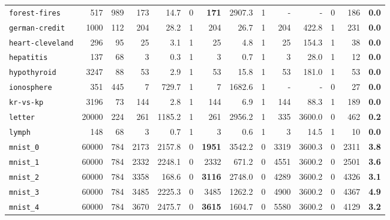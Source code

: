 \begin{tabular}{lccrrrrrrrrrrr}
\texttt{forest-fires} & \multicolumn{1}{r}{517} & \multicolumn{1}{r}{989}  & 173 & 14.7 & 0 & \textbf{171} & 2907.3 & 1 & - & - & 0 & 186 & \textbf{0.0}\\
\texttt{german-credit} & \multicolumn{1}{r}{1000} & \multicolumn{1}{r}{112}  & 204 & 28.2 & 1 & 204 & 26.7 & 1 & 204 & 422.8 & 1 & 231 & \textbf{0.0}\\
\texttt{heart-cleveland} & \multicolumn{1}{r}{296} & \multicolumn{1}{r}{95}  & 25 & 3.1 & 1 & 25 & 4.8 & 1 & 25 & 154.3 & 1 & 38 & \textbf{0.0}\\
\texttt{hepatitis} & \multicolumn{1}{r}{137} & \multicolumn{1}{r}{68}  & 3 & 0.3 & 1 & 3 & 0.7 & 1 & 3 & 28.0 & 1 & 12 & \textbf{0.0}\\
\texttt{hypothyroid} & \multicolumn{1}{r}{3247} & \multicolumn{1}{r}{88}  & 53 & 2.9 & 1 & 53 & 15.8 & 1 & 53 & 181.0 & 1 & 53 & \textbf{0.0}\\
\texttt{ionosphere} & \multicolumn{1}{r}{351} & \multicolumn{1}{r}{445}  & 7 & 729.7 & 1 & 7 & 1682.6 & 1 & - & - & 0 & 27 & \textbf{0.0}\\
\texttt{kr-vs-kp} & \multicolumn{1}{r}{3196} & \multicolumn{1}{r}{73}  & 144 & 2.8 & 1 & 144 & 6.9 & 1 & 144 & 88.3 & 1 & 189 & \textbf{0.0}\\
\texttt{letter} & \multicolumn{1}{r}{20000} & \multicolumn{1}{r}{224}  & 261 & 1185.2 & 1 & 261 & 2956.2 & 1 & 335 & 3600.0 & 0 & 462 & \textbf{0.2}\\
\texttt{lymph} & \multicolumn{1}{r}{148} & \multicolumn{1}{r}{68}  & 3 & 0.7 & 1 & 3 & 0.6 & 1 & 3 & 14.5 & 1 & 10 & \textbf{0.0}\\
\texttt{mnist\_0} & \multicolumn{1}{r}{60000} & \multicolumn{1}{r}{784}  & 2173 & 2157.8 & 0 & \textbf{1951} & 3542.2 & 0 & 3319 & 3600.3 & 0 & 2311 & \textbf{3.8}\\
\texttt{mnist\_1} & \multicolumn{1}{r}{60000} & \multicolumn{1}{r}{784}  & 2332 & 2248.1 & 0 & 2332 & 671.2 & 0 & 4551 & 3600.2 & 0 & 2501 & \textbf{3.6}\\
\texttt{mnist\_2} & \multicolumn{1}{r}{60000} & \multicolumn{1}{r}{784}  & 3358 & 168.6 & 0 & \textbf{3116} & 2748.0 & 0 & 4289 & 3600.2 & 0 & 4326 & \textbf{3.1}\\
\texttt{mnist\_3} & \multicolumn{1}{r}{60000} & \multicolumn{1}{r}{784}  & 3485 & 2225.3 & 0 & 3485 & 1262.2 & 0 & 4900 & 3600.2 & 0 & 4367 & \textbf{4.9}\\
\texttt{mnist\_4} & \multicolumn{1}{r}{60000} & \multicolumn{1}{r}{784}  & 3670 & 2475.7 & 0 & \textbf{3615} & 1604.7 & 0 & 5580 & 3600.2 & 0 & 4129 & \textbf{3.2}\\

\end{tabular}
